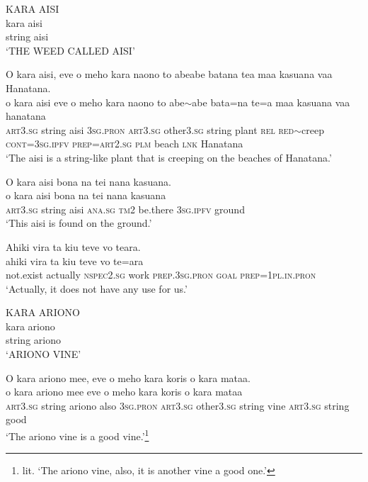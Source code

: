 \ea\label{ex:text7-1}
KARA AISI\\
\gll kara	aisi\\
     string	aisi\\
\glt `THE WEED CALLED AISI'
\z

\ea\label{ex:text7-2}
O kara aisi, eve o meho kara naono to abeabe batana tea maa kasuana vaa Hanatana.\\
\gll o	kara	aisi	eve	o	meho	kara	naono	to	abe{$\sim$}abe	bata=na	te=a	maa	kasuana	vaa	hanatana\\
     \textsc{art}3.\textsc{sg}	string	aisi	3\textsc{sg}.\textsc{pron}	\textsc{art}3.\textsc{sg}	other3.\textsc{sg}	string	plant	\textsc{rel}	\textsc{red}{$\sim$}creep	\textsc{cont}=3\textsc{sg}.\textsc{ipfv}	\textsc{prep}=\textsc{art}2.\textsc{sg}	\textsc{plm}	beach	\textsc{lnk}	Hanatana\\
\glt `The aisi is a string-like plant that is creeping on the beaches of Hanatana.'
\z

\ea\label{ex:text7-3}
O kara aisi bona na tei nana kasuana.\\
\gll o	kara	aisi	bona	na	tei	nana	kasuana\\
     \textsc{art}3.\textsc{sg}	string	aisi	\textsc{ana}.\textsc{sg}	\textsc{tm}2	be.there	3\textsc{sg}.\textsc{ipfv}	ground\\
\glt `This aisi is found on the ground.'
\z

\ea\label{ex:text7-4}
Ahiki vira ta kiu teve vo teara.\\
\gll ahiki	vira	ta	kiu	teve	vo	te=ara\\
     not.exist	actually	\textsc{nspec}2.\textsc{sg}	work	\textsc{prep}.3\textsc{sg}.\textsc{pron}	\textsc{goal}	\textsc{prep}=1\textsc{pl}.\textsc{in}.\textsc{pron}\\
\glt `Actually, it does not have any use for us.'
\z

\ea\label{ex:text7-5}
KARA ARIONO\\
\gll kara	ariono\\
     string	ariono\\
\glt `ARIONO VINE'
\z

\ea\label{ex:text7-6}
O kara ariono mee, eve o meho kara koris o kara mataa.\\
\gll o	kara	ariono	mee	eve	o	meho	kara	koris	o	kara	mataa\\
     \textsc{art}3.\textsc{sg}	string	ariono	also	3\textsc{sg}.\textsc{pron}	\textsc{art}3.\textsc{sg}	other3.\textsc{sg}	string	vine	\textsc{art}3.\textsc{sg}	string	good\\
\glt `The ariono vine is a good vine.'\footnote{lit. `The ariono vine, also, it is another vine a good one.'}
\z

